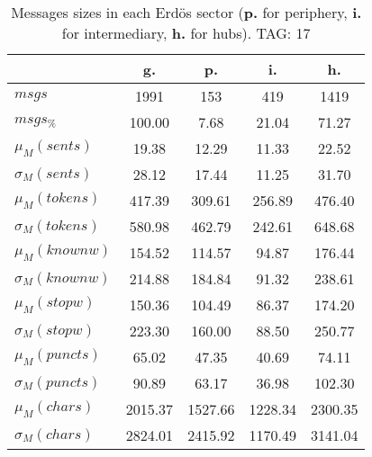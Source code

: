\begin{table}[h!]
\begin{center}
\begin{tabular}{| l | c | c | c | c |}\hline
 & g. & p. & i. & h. \\\hline
$msgs$ & 1991  & 153  & 419  & 1419 \\\hline
$msgs_{\%}$ & 100.00  & 7.68  & 21.04  & 71.27 \\\hline
$\mu_M(sents)$ & 19.38  & 12.29  & 11.33  & 22.52 \\\hline
$\sigma_M(sents)$ & 28.12  & 17.44  & 11.25  & 31.70 \\\hline
$\mu_M(tokens)$ & 417.39  & 309.61  & 256.89  & 476.40 \\\hline
$\sigma_M(tokens)$ & 580.98  & 462.79  & 242.61  & 648.68 \\\hline
$\mu_M(knownw)$ & 154.52  & 114.57  & 94.87  & 176.44 \\\hline
$\sigma_M(knownw)$ & 214.88  & 184.84  & 91.32  & 238.61 \\\hline
$\mu_M(stopw)$ & 150.36  & 104.49  & 86.37  & 174.20 \\\hline
$\sigma_M(stopw)$ & 223.30  & 160.00  & 88.50  & 250.77 \\\hline
$\mu_M(puncts)$ & 65.02  & 47.35  & 40.69  & 74.11 \\\hline
$\sigma_M(puncts)$ & 90.89  & 63.17  & 36.98  & 102.30 \\\hline
$\mu_M(chars)$ & 2015.37  & 1527.66  & 1228.34  & 2300.35 \\\hline
$\sigma_M(chars)$ & 2824.01  & 2415.92  & 1170.49  & 3141.04 \\\hline
\end{tabular}
\caption{Messages sizes in each Erd\"os sector ({{\bf p.}} for periphery, {{\bf i.}} for intermediary, {{\bf h.}} for hubs). TAG: 17}
\end{center}
\end{table}
